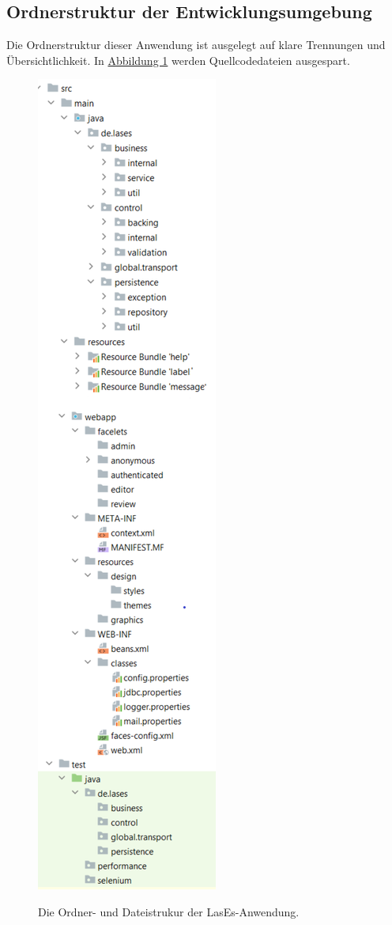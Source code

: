 \subsection{Ordnerstruktur der Entwicklungsumgebung}

Die Ordnerstruktur dieser Anwendung ist ausgelegt auf klare Trennungen und Übersichtlichkeit.
In \hyperref[feinarch:orddia]{Abbildung 1} werden Quellcodedateien ausgespart.

\begin{figure}[H]
    \centering
    \includegraphics[height=0.8\textheight]{graphics/folder_structure2.0}\label{feinarch:orddia}
    \caption{Die Ordner- und Dateistrukur der LasEs-Anwendung.}
\end{figure}